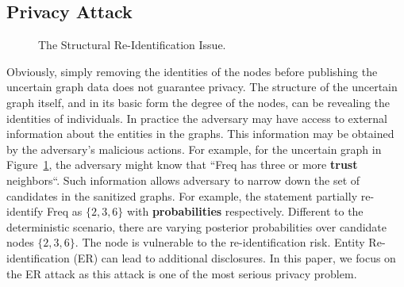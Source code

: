 \subsection{Privacy Attack}
\label{sec:AMPC}
\vspace{-5pt}
\begin{figure}[!htb]
  \vspace{-10pt}
    \vspace{-7pt}
    \caption{The Structural Re-Identification Issue.}
    \label{fig:privacyAttack}
    \vspace{-7pt}
\end{figure} 
Obviously, simply removing the identities of the nodes before publishing the uncertain graph data does not guarantee privacy.  The structure of the uncertain graph itself, and in its basic form the degree of the nodes, can be revealing the identities of individuals. 
In practice the adversary may have access to external information about the entities in the graphs. This information may be obtained by the adversary's malicious actions. For example, for the uncertain graph in Figure~\ref{fig:privacyAttack}, the adversary might know that ``Freq has three or more \textbf{trust} neighbors“. Such information allows adversary to narrow down the set of candidates in the sanitized graphs. For example, the statement partially re-identify Freq as $\lbrace 2,3,6 \rbrace$ with \textbf{probabilities} respectively. Different to the deterministic scenario,  there are varying posterior probabilities over candidate nodes $\lbrace 2,3,6 \rbrace$. The node is vulnerable to the re-identification risk. Entity Re-identification (ER) can lead to additional disclosures. In this paper, we focus on the ER attack as this attack is one of the most serious privacy problem. 

